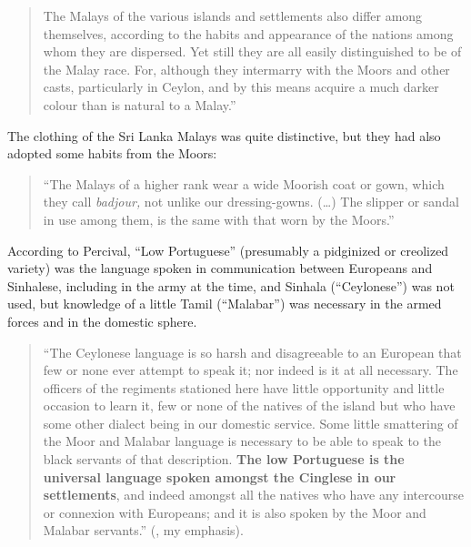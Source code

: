 \begin{quote}
The Malays of the various islands and settlements also differ among themselves, according to the habits and appearance of the nations among whom they are dispersed. Yet still they are all easily distinguished to be of the Malay race. For, although they intermarry with the Moors and other casts, particularly in Ceylon, and by this means acquire a much darker colour than is natural to a Malay.'' \citep[168]{Percival1805}
\end{quote}

The clothing of the Sri Lanka Malays was quite distinctive, but they had also adopted some habits from the Moors:

\begin{quote}
{``The Malays of a higher rank wear a wide Moorish coat or gown, which they call} {\textit{badjour,}} {not unlike our dressing-gowns. ({\dots}) The slipper or sandal in use among them, is the same with that worn by the Moors.''} {\citep[169]{Percival1805}}
\end{quote}

{According to Percival, ``Low Portuguese'' (presumably a pidginized or creolized variety) was the language spoken in communication between Europeans and Sinhalese, including} {in the army at the time, and Sinhala (``Ceylonese'') was not used, but knowledge of a little Tamil (``Malabar'') was necessary in the armed forces and in the domestic sphere.}

\begin{quote}
``The Ceylonese language is so harsh and disagreeable to an European that few or none ever attempt to speak it; nor indeed is it at all necessary. The officers of the regiments stationed here have little opportunity and little occasion to learn it, few or none of the natives of the island but who have some other dialect being in our domestic service. Some little smattering of the Moor and Malabar language is necessary to be able to speak to the black servants of that description. \textbf{The low Portuguese is the universal language spoken amongst the Cinglese in our settlements}, and indeed amongst all the natives who have any intercourse or connexion with Europeans; and it is also spoken by the Moor and Malabar servants.'' (\citet[203]{Percival1805}, my emphasis).
\end{quote}

